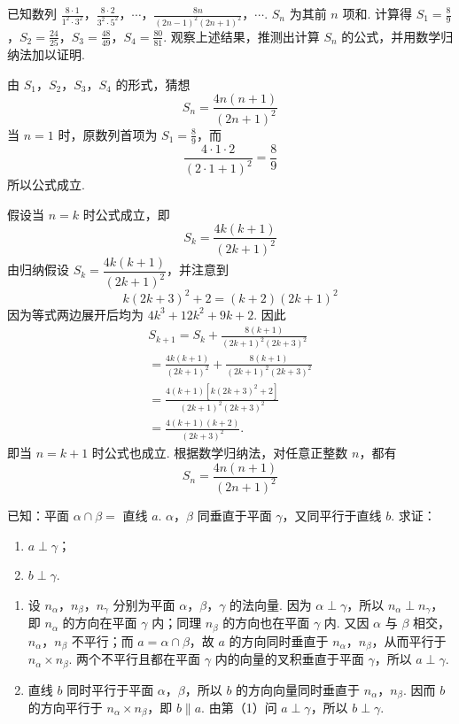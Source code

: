 \documentclass[UTF8,a4paper,oneside,11pt]{ctexbook}
\begin{document}
\begin{problem}
已知数列 \(\frac{8\cdot 1}{1^2\cdot 3^2}\)，\(\frac{8\cdot 2}{3^2\cdot 5^2}\)，\(\cdots\)，\(\frac{8n}{(2n-1)^2(2n+1)^2}\)，\(\cdots\). \(S_n\) 为其前 \(n\) 项和. 计算得 \(S_1=\frac{8}{9}\)，\(S_2=\frac{24}{25}\)，\(S_3=\frac{48}{49}\)，\(S_4=\frac{80}{81}\). 观察上述结果，推测出计算 \(S_n\) 的公式，并用数学归纳法加以证明.
\end{problem}

\begin{solution}
由 \(S_1\)，\(S_2\)，\(S_3\)，\(S_4\) 的形式，猜想
\[
S_n=\frac{4n(n+1)}{(2n+1)^2}
\]
当 \(n=1\) 时，原数列首项为 \(S_1=\frac{8}{9}\)，而
\[
\frac{4\cdot1\cdot2}{(2\cdot1+1)^2}=\frac89
\]
所以公式成立.

假设当 \(n=k\) 时公式成立，即
\[
S_k=\frac{4k(k+1)}{(2k+1)^2}
\]
由归纳假设 \(S_k=\dfrac{4k(k+1)}{(2k+1)^2}\)，并注意到
\[
k(2k+3)^2+2=(k+2)(2k+1)^2
\]
因为等式两边展开后均为 \(4k^3+12k^2+9k+2\). 因此
\[
\begin{gathered}
S_{k+1}=S_k+\frac{8(k+1)}{(2k+1)^2(2k+3)^2}\\
=\frac{4k(k+1)}{(2k+1)^2}
+\frac{8(k+1)}{(2k+1)^2(2k+3)^2}\\
=\frac{4(k+1)\left[k(2k+3)^2+2\right]}
{(2k+1)^2(2k+3)^2}\\
=\frac{4(k+1)(k+2)}{(2k+3)^2}.
\end{gathered}
\]
即当 \(n=k+1\) 时公式也成立. 根据数学归纳法，对任意正整数 \(n\)，都有
\[
S_n=\frac{4n(n+1)}{(2n+1)^2}
\]
\end{solution}

\begin{problem}
已知：平面 \(\alpha\cap\beta=\) 直线 \(a\). \(\alpha\)，\(\beta\) 同垂直于平面 \(\gamma\)，又同平行于直线 \(b\). 求证：

\begin{enumerate}
\item \(a\perp\gamma\)；
\item \(b\perp\gamma\).
\end{enumerate}
\end{problem}

\begin{solution}
\begin{enumerate}
\item 设 \(n_\alpha\)，\(n_\beta\)，\(n_\gamma\) 分别为平面 \(\alpha\)，\(\beta\)，\(\gamma\) 的法向量. 因为 \(\alpha\perp\gamma\)，所以 \(n_\alpha\perp n_\gamma\)，即 \(n_\alpha\) 的方向在平面 \(\gamma\) 内；同理 \(n_\beta\) 的方向也在平面 \(\gamma\) 内. 又因 \(\alpha\) 与 \(\beta\) 相交，\(n_\alpha\)，\(n_\beta\) 不平行；而 \(a=\alpha\cap\beta\)，故 \(a\) 的方向同时垂直于 \(n_\alpha\)，\(n_\beta\)，从而平行于 \(n_\alpha\times n_\beta\). 两个不平行且都在平面 \(\gamma\) 内的向量的叉积垂直于平面 \(\gamma\)，所以 \(a\perp\gamma\).
\item 直线 \(b\) 同时平行于平面 \(\alpha\)，\(\beta\)，所以 \(b\) 的方向向量同时垂直于 \(n_\alpha\)，\(n_\beta\). 因而 \(b\) 的方向平行于 \(n_\alpha\times n_\beta\)，即 \(b\parallel a\). 由第（1）问 \(a\perp\gamma\)，所以 \(b\perp\gamma\).
\end{enumerate}
\end{solution}
\end{document}

